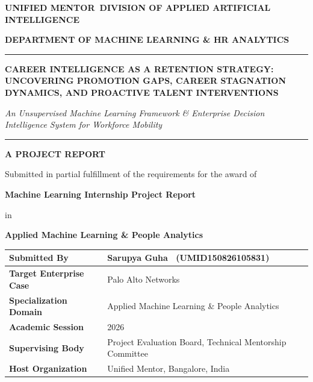 \documentclass[12pt,a4paper,oneside]{report}
\newcommand{\ReportTitle}{CAREER INTELLIGENCE AS A RETENTION STRATEGY: UNCOVERING PROMOTION GAPS, CAREER STAGNATION DYNAMICS, AND PROACTIVE TALENT INTERVENTIONS}
\newcommand{\ReportType}{Machine Learning Internship Project Report}
\newcommand{\BranchName}{Applied Machine Learning \& People Analytics}
\newcommand{\UniversityName}{Unified Mentor}
\newcommand{\CollegeName}{Division of Applied Artificial Intelligence}
\newcommand{\DepartmentName}{Department of Machine Learning \& HR Analytics}
\newcommand{\CollegeLocation}{Bangalore, India}
\newcommand{\AcademicYear}{2026}
\newcommand{\SupervisorName}{Project Evaluation Board}
\newcommand{\SupervisorDesignation}{Technical Mentorship Committee}
\newcommand{\AuthorName}{Sarupya Guha}
\newcommand{\InternID}{UMID150826105831}
\newcommand{\TargetEnterprise}{Palo Alto Networks}
\begin{document}
\begin{titlepage}
\thispagestyle{empty}
\centering

\vspace*{0.15in}
{\fontsize{11}{14}\selectfont\bfseries\uppercase{\UniversityName\ \CollegeName}\par}
{\fontsize{10}{13}\selectfont\bfseries\uppercase{\DepartmentName}\par}

\vspace{0.15in}
\rule{\textwidth}{2pt}
\vspace{0.15in}

{\fontsize{21}{26}\selectfont\bfseries\uppercase{\ReportTitle}\par}

\vspace{0.15in}
{\fontsize{13}{16}\selectfont\itshape An Unsupervised Machine Learning Framework \& Enterprise Decision Intelligence System for Workforce Mobility\par}

\vspace{0.15in}
\rule{\textwidth}{1pt}

\vspace{0.25in}
{\fontsize{12}{15}\selectfont\bfseries A PROJECT REPORT\par}
{\fontsize{11}{14}\selectfont Submitted in partial fulfillment of the requirements for the award of\par}
{\fontsize{12}{15}\selectfont\bfseries \ReportType\par}
{\fontsize{11}{14}\selectfont in\par}
{\fontsize{12}{15}\selectfont\bfseries \BranchName\par}

\vspace{0.25in}
\begin{center}
\begin{tabular}{|C{4.5cm}|L{11.0cm}|}
\hline
\textbf{Submitted By} & \textbf{\AuthorName} \ (\InternID) \\ \hline
\textbf{Target Enterprise Case} & \TargetEnterprise \\ \hline
\textbf{Specialization Domain} & \BranchName \\ \hline
\textbf{Academic Session} & \AcademicYear \\ \hline
\textbf{Supervising Body} & \SupervisorName, \SupervisorDesignation \\ \hline
\textbf{Host Organization} & \UniversityName, \CollegeLocation \\ \hline
\end{tabular}
\end{center}


\end{titlepage}
\end{document}
